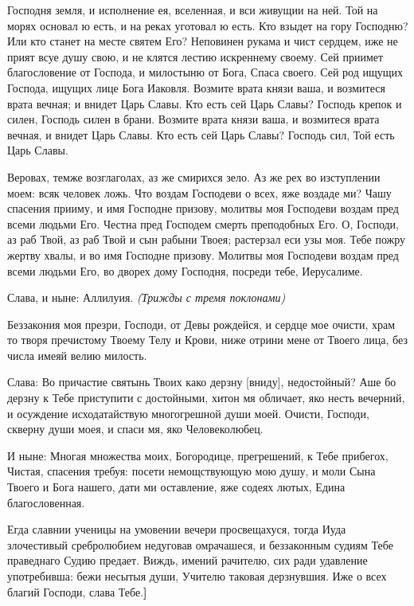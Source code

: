 Господня земля, и исполнение ея, вселенная, и вси живущии на ней. Той на морях основал ю есть, и на реках уготовал ю есть. Кто взыдет на гору Господню? Или кто станет на месте святем Его? Неповинен рукама и чист сердцем, иже не прият всуе душу свою, и не клятся лестию искреннему своему. Сей приимет благословение от Господа, и милостыню от Бога, Спаса своего. Сей род ищущих Господа, ищущих лице Бога Иаковля. Возмите врата князи ваша, и возмитеся врата вечная; и внидет Царь Славы. Кто есть сей Царь Славы? Господь крепок и силен, Господь силен в брани. Возмите врата князи ваша, и возмитеся врата вечная, и внидет Царь Славы. Кто есть сей Царь Славы? Господь сил, Той есть Царь Славы.




Веровах, темже возглаголах, аз же смирихся зело. Аз же рех во изступлении моем: всяк человек ложь. Что воздам Господеви о всех, яже воздаде ми? Чашу спасения прииму, и имя Господне призову, молитвы моя Господеви воздам пред всеми людьми Его. Честна пред Господем смерть преподобных Его. О, Господи, аз раб Твой, аз раб Твой и сын рабыни Твоея; растерзал еси узы моя. Тебе пожру жертву хвалы, и во имя Господне призову. Молитвы моя Господеви воздам пред всеми людьми Его, во дворех дому Господня, посреди тебе, Иерусалиме.


Слава, и ныне: Аллилуия. \itshape (Трижды с тремя поклонами)\normalfont{}




Беззакония моя презри, Господи, от Девы рождейся, и сердце мое очисти, храм то творя пречистому Твоему Телу и Крови, ниже отрини мене от Твоего лица, без числа имеяй велию милость.


Слава: Во причастие святынь Твоих како дерзну [вниду], недостойный? Аше бо дерзну к Тебе приступити с достойными, хитон мя обличает, яко несть вечерний, и осуждение исходатайствую многогрешной души моей. Очисти, Господи, скверну души моея, и спаси мя, яко Человеколюбец.


И ныне: Многая множества моих, Богородице, прегрешений, к Тебе прибегох, Чистая, спасения требуя: посети немощствующую мою душу, и моли Сына Твоего и Бога нашего, дати ми оставление, яже содеях лютых, Едина благословенная.


\mysubsubsection{[Во Святую же Четыредесятницу:}


Егда славнии ученицы на умовении вечери просвещахуся, тогда Иуда злочестивый сребролюбием недуговав омрачашеся, и беззаконным судиям Тебе праведнаго Судию предает. Виждь, имений рачителю, сих ради удавление употребивша: бежи несытыя души, Учителю таковая дерзнувшия. Иже о всех благий Господи, слава Тебе.\bfseries ]\normalfont{}



